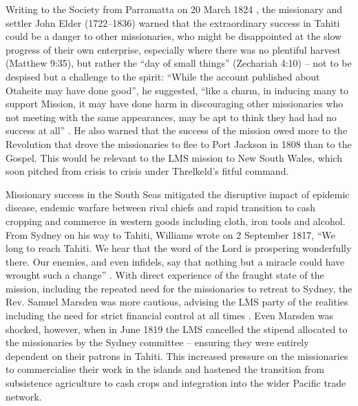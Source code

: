 Writing to the Society from Parramatta on 20 March 1824 \citep[box 2/ folder 3]{lms_australia_1798-1968}, the missionary and settler John Elder (1722--1836) warned that the extraordinary success in Tahiti could be a danger to other missionaries, who might be disappointed at the slow progress of their own enterprise, especially where there was no plentiful harvest (Matthew 9:35), but rather the “day of small things” (Zechariah 4:10) -- not to be despised but a challenge to the spirit: “While the account published about Otaheite may have done good”, he suggested, “like a charm, in inducing many to support Mission, it may have done harm in discouraging other missionaries who not meeting with the same appearances, may be apt to think they had had no success at all” \citep[box 2/ folder 3]{lms_australia_1798-1968}. He also warned that the success of the mission owed more to the Revolution that drove the missionaries to flee to Port Jackson in 1808 than to the Gospel. This would be relevant to the LMS mission to New South Wales, which soon pitched from crisis to crisis under Threlkeld’s fitful command.

Missionary success in the South Seas mitigated the disruptive impact of epidemic disease, endemic warfare between rival chiefs and rapid transition to cash cropping and commerce in western goods including cloth, iron tools and alcohol. From Sydney on his way to Tahiti, Williams wrote on 2 September 1817, “We long to reach Tahiti. We hear that the word of the Lord is prospering wonderfully there. Our enemies, and even infidels, say that nothing but a miracle could have wrought such a change” \citep[33]{prout_memoirs_1843}. With direct experience of the fraught state of the mission, including the repeated need for the missionaries to retreat to Sydney, the Rev. Samuel Marsden was more cautious, advising the LMS party of the realities including the need for strict financial control at all times \citep[19]{gunson_australian_1974a}. Even Marsden was shocked, however, when in June 1819 the LMS cancelled the stipend allocated to the missionaries by the Sydney committee -- ensuring they were entirely dependent on their patrons in Tahiti. This increased pressure on the missionaries to commercialise their work in the islands and hastened the transition from subsistence agriculture to cash crops and integration into the wider Pacific trade network.

